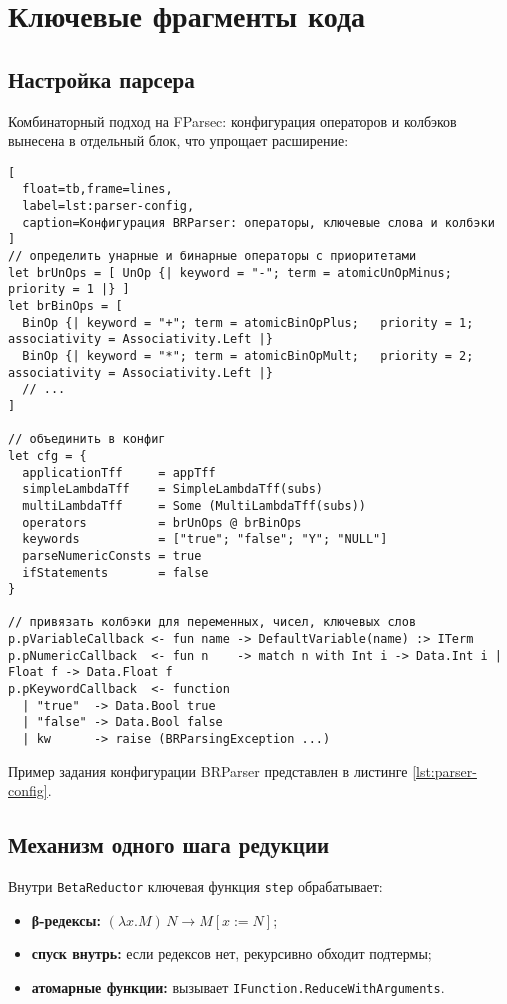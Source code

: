 \section{Ключевые фрагменты кода}

\subsection{Настройка парсера}
Комбинаторный подход на FParsec: конфигурация операторов и колбэков вынесена в отдельный блок, что упрощает расширение:

\begin{lstlisting}[
  float=tb,frame=lines,
  label=lst:parser-config,
  caption=Конфигурация BRParser: операторы, ключевые слова и колбэки
]
// определить унарные и бинарные операторы с приоритетами
let brUnOps = [ UnOp {| keyword = "-"; term = atomicUnOpMinus; priority = 1 |} ]
let brBinOps = [
  BinOp {| keyword = "+"; term = atomicBinOpPlus;   priority = 1; associativity = Associativity.Left |}
  BinOp {| keyword = "*"; term = atomicBinOpMult;   priority = 2; associativity = Associativity.Left |}
  // ...
]

// объединить в конфиг
let cfg = {
  applicationTff     = appTff
  simpleLambdaTff    = SimpleLambdaTff(subs)
  multiLambdaTff     = Some (MultiLambdaTff(subs))
  operators          = brUnOps @ brBinOps
  keywords           = ["true"; "false"; "Y"; "NULL"]
  parseNumericConsts = true
  ifStatements       = false
}

// привязать колбэки для переменных, чисел, ключевых слов
p.pVariableCallback <- fun name -> DefaultVariable(name) :> ITerm
p.pNumericCallback  <- fun n    -> match n with Int i -> Data.Int i | Float f -> Data.Float f
p.pKeywordCallback  <- function
  | "true"  -> Data.Bool true
  | "false" -> Data.Bool false
  | kw      -> raise (BRParsingException ...)
\end{lstlisting}

Пример задания конфигурации BRParser представлен в листинге \ref{lst:parser-config}.

\subsection{Механизм одного шага редукции}
Внутри \texttt{BetaReductor} ключевая функция \texttt{step} обрабатывает:
\begin{itemize}
  \item \textbf{β-редексы:} $(\lambda x.M)\,N \to M[x:=N]$;
  \item \textbf{спуск внутрь:} если редексов нет, рекурсивно обходит подтермы;
  \item \textbf{атомарные функции:} вызывает \texttt{IFunction.ReduceWithArguments}.
\end{itemize}

